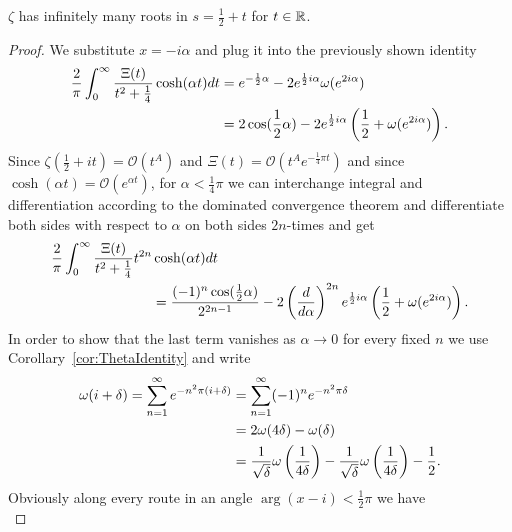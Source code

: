 \begin{theorem}
	$\zeta$ has infinitely many roots in $s = \frac{1}{2} + t$ for $t \in \mathbb{R}$.
\end{theorem}
\begin{proof}
	We substitute $x = -i \alpha$ and plug it into the previously shown identity
\begin{equation*}
\begin{aligned}
	\frac{2}{\pi} \int _0 ^{\infty} \frac{\Xi(t)}{t^2 + \frac{1}{4}} \cosh(\alpha t) dt 
	&= e^{-\frac{1}{2} \alpha} - 2e^{\frac{1}{2} i \alpha} \omega(e^{2 i \alpha}) \\
	&= 2 \cos(\frac{1}{2} \alpha) - 2e^{\frac{1}{2} i \alpha} \left(\frac{1}{2} + \omega(e^{2 i \alpha})\right).
\end{aligned}
\end{equation*}
	Since $\zeta(\frac{1}{2} + it) = \mathcal{O}(t^A)$ and $\Xi(t) = \mathcal{O}(t^A e^{-\frac{1}{4} \pi t})$ and since $\cosh(\alpha t) = \mathcal{O}(e^{\alpha t})$, for $\alpha < \frac{1}{4} \pi$ we can interchange integral and differentiation according to the dominated convergence theorem and differentiate both sides with respect to $\alpha$ on both sides $2n$-times and get
\begin{equation*}
\begin{aligned}	
	\frac{2}{\pi} \int _0 ^{\infty} \frac{\Xi(t)}{t^2 + \frac{1}{4}} t^{2n}
		&\cosh(\alpha t) dt \\
		&= \frac{(-1)^{n} \cos(\frac{1}{2} \alpha)}{2^{2n - 1}} - 2 \left(\frac{d}{d\alpha}\right)^{2n}e^{\frac{1}{2} i \alpha} \left(\frac{1}{2} + \omega(e^{2 i \alpha})\right).
\end{aligned}
\end{equation*}
	In order to show that the last term vanishes as $\alpha \to 0$ for every fixed $n$ we use Corollary~\ref{cor:ThetaIdentity} and write
\begin{equation*}
\begin{aligned}
	\omega(i + \delta) = \sum _{n=1} ^{\infty} e^{-n^2 \pi (i + \delta)}
		&= \sum _{n=1} ^{\infty} (-1)^n e^{-n^2 \pi \delta} \\
		&= 2 \omega(4 \delta) - \omega(\delta) \\
		&= \frac{1}{\sqrt \delta} \omega\left(\frac{1}{4\delta}\right) - \frac{1}{\sqrt \delta} \omega\left(\frac{1}{4\delta}\right) - \frac{1}{2}.
\end{aligned}
\end{equation*}
	Obviously along every route in an angle $\arg(x - i) < \frac{1}{2} \pi$ we have
\begin{equation*}

\end{equation*}
\end{proof}
